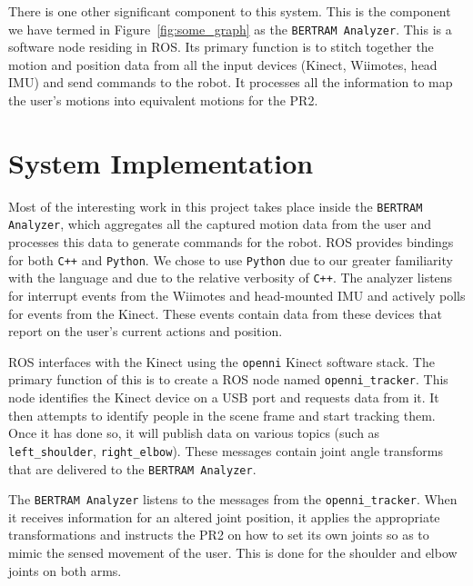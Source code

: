\documentclass{sig-alternate}
\begin{document}
There is one other significant component to this system. This is the
component we have
termed in Figure~\ref{fig:some_graph} as the {\tt BERTRAM Analyzer}. This is a 
software node residing in ROS. Its primary function is to stitch together the
motion and position data from all the input devices (Kinect, Wiimotes, head 
IMU) and send commands to the robot. It processes all the information to map the user's motions
into equivalent motions for the PR2.

\section{System Implementation}
Most of the interesting work in this project takes place inside the
{\tt BERTRAM Analyzer}, which aggregates all the captured motion data from the
user and processes this data to generate commands for the robot. ROS provides
bindings for both {\tt C++} and {\tt Python}. We chose to use {\tt Python} due to our
greater familiarity with the language and due to the relative verbosity of {\tt C++}.
The analyzer listens for interrupt events from the Wiimotes and head-mounted
IMU and actively polls for events from the Kinect. These events contain data
from these devices that report on the user's current actions and position.

ROS interfaces with the Kinect using the {\tt openni} Kinect software stack. The primary
function of this is to create a ROS node named {\tt openni\_tracker}. This
node identifies the Kinect device on a USB port and requests data
from it. It then attempts to identify people in the scene frame and start
tracking them. Once it has done so, it will publish data on various
topics (such as {\tt left\_shoulder}, {\tt right\_elbow}). These messages
contain joint angle transforms that are delivered to the {\tt BERTRAM Analyzer}.

The {\tt BERTRAM Analyzer} listens to the messages from the
 {\tt openni\_tracker}.
When it receives information for an altered joint position, it applies the
appropriate transformations and instructs the PR2 on how to set its own joints
so as to mimic the sensed movement of the user. This is done for the shoulder
and elbow joints on both arms.
\end{document}

